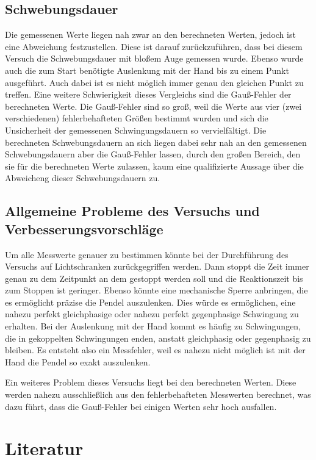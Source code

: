 \documentclass[titlepage=firstcover, captions=tableheading]{scrartcl}
\begin{document}
\subsection{Schwebungsdauer}

Die gemessenen Werte liegen nah zwar an den berechneten Werten, jedoch ist eine Abweichung festzustellen.
Diese ist darauf zurückzuführen, dass bei diesem Versuch die Schwebungsdauer mit bloßem Auge gemessen wurde.
Ebenso wurde auch die zum Start benötigte Auslenkung mit der Hand bis zu einem Punkt ausgeführt.
Auch dabei ist es nicht möglich immer genau den gleichen Punkt zu treffen.
Eine weitere Schwierigkeit dieses Vergleichs sind die Gauß-Fehler der berechneten Werte.
Die Gauß-Fehler sind so groß, weil die Werte aus vier (zwei verschiedenen) fehlerbehafteten Größen bestimmt wurden 
und sich die Unsicherheit der gemessenen Schwingungsdauern so vervielfältigt.
Die berechneten Schwebungsdauern an sich liegen dabei sehr nah an den gemessenen Schwebungsdauern aber die Gauß-Fehler lassen,
durch den großen Bereich, den sie für die berechneten Werte zulassen,
kaum eine qualifizierte Aussage über die Abweicheng dieser Schwebungsdauern zu.

\subsection{Allgemeine Probleme des Versuchs und Verbesserungsvorschläge}

Um alle Messwerte genauer zu bestimmen könnte bei der Durchführung des Versuchs auf Lichtschranken zurückgegriffen werden. 
Dann stoppt die Zeit immer genau zu dem Zeitpunkt an dem gestoppt werden soll und die Reaktionszeit bis zum Stoppen ist geringer.
Ebenso könnte eine mechanische Sperre anbringen, die es ermöglicht präzise die Pendel auszulenken. 
Dies würde es ermöglichen, eine nahezu perfekt gleichphasige oder nahezu perfekt gegenphasige Schwingung zu erhalten. 
Bei der Auslenkung mit der Hand kommt es häufig zu Schwingungen, die in gekoppelten Schwingungen enden, anstatt gleichphasig oder gegenphasig zu bleiben.
Es entsteht also ein Messfehler, weil es nahezu nicht möglich ist mit der Hand die Pendel so exakt auszulenken.

Ein weiteres Problem dieses Versuchs liegt bei den berechneten Werten. Diese werden nahezu ausschließlich aus den fehlerbehafteten Messwerten berechnet,
was dazu führt, dass die Gauß-Fehler bei einigen Werten sehr hoch ausfallen.

\section{Literatur}
\end{document}
